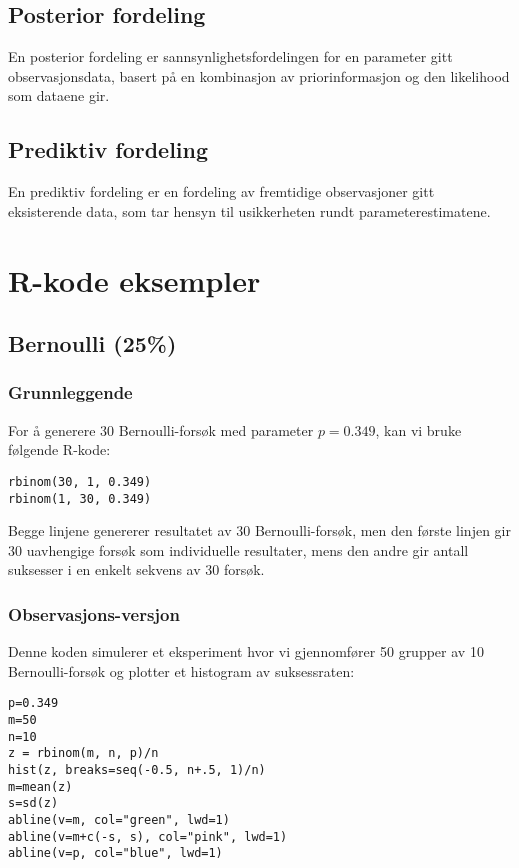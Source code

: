 \documentclass{article}
\begin{document}
\subsection*{Posterior fordeling}
En posterior fordeling er sannsynlighetsfordelingen for en parameter gitt observasjonsdata, basert på en kombinasjon av priorinformasjon og den likelihood som dataene gir.

\subsection*{Prediktiv fordeling}
En prediktiv fordeling er en fordeling av fremtidige observasjoner gitt eksisterende data, som tar hensyn til usikkerheten rundt parameterestimatene.

\section{R-kode eksempler}

\subsection*{Bernoulli (25\%)}
\subsubsection*{Grunnleggende}
For å generere 30 Bernoulli-forsøk med parameter \(p = 0.349\), kan vi bruke følgende R-kode:

\begin{verbatim}
rbinom(30, 1, 0.349)
rbinom(1, 30, 0.349)
\end{verbatim}

Begge linjene genererer resultatet av 30 Bernoulli-forsøk, men den første linjen gir 30 uavhengige forsøk som individuelle resultater, mens den andre gir antall suksesser i en enkelt sekvens av 30 forsøk.

\subsubsection*{Observasjons-versjon}
Denne koden simulerer et eksperiment hvor vi gjennomfører 50 grupper av 10 Bernoulli-forsøk og plotter et histogram av suksessraten:

\begin{verbatim}
p=0.349
m=50
n=10
z = rbinom(m, n, p)/n
hist(z, breaks=seq(-0.5, n+.5, 1)/n)
m=mean(z)
s=sd(z)
abline(v=m, col="green", lwd=1)
abline(v=m+c(-s, s), col="pink", lwd=1)
abline(v=p, col="blue", lwd=1)
\end{verbatim}
\end{document}
